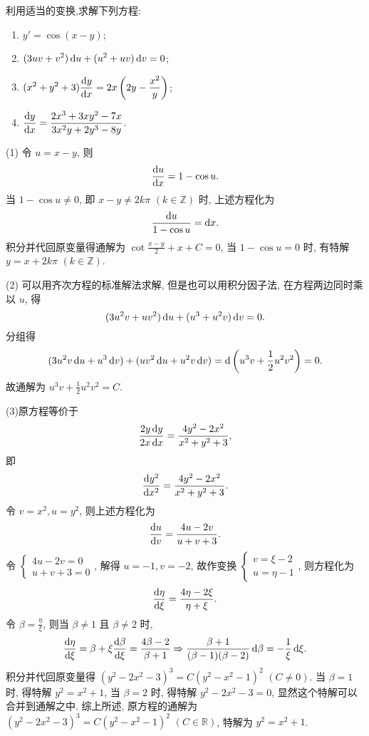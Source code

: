 \begin{exercise}
  利用适当的变换,求解下列方程:
  \begin{enumerate}[(1)]
  \item $\displaystyle y'=\cos(x-y)$;
  \item $\displaystyle(3uv+v^2)\mathop{}\!\mathrm{d} u+(u^2+uv)\mathop{}\!\mathrm{d} v=0$;
  \item $\displaystyle(x^2+y^2+3)\frac{\mathop{}\!\mathrm{d} y}{\mathop{}\!\mathrm{d} x}=2x\left(2y-\frac{x^2}{y}\right)$;
  \item $\displaystyle\frac{\mathop{}\!\mathrm{d} y}{\mathop{}\!\mathrm{d} x}=\frac{2x^3+3xy^2-7x}{3x^2y+2y^3-8y}$.
  \end{enumerate}
\end{exercise}

\begin{solve}
  (1) 令 $u=x-y$, 则
  \[\frac{\mathop{}\!\mathrm{d} u}{\mathop{}\!\mathrm{d} x}=1-\cos u.\]
  当 $1-\cos u\neq 0$, 即 $x-y\neq 2k\pi$ $(k\in\mathbb{Z})$ 时, 上述方程化为
  \[\frac{\mathop{}\!\mathrm{d} u}{1-\cos u}=\mathop{}\!\mathrm{d} x.\]
  积分并代回原变量得通解为 $\cot\frac{x-y}{2}+x+C=0$, 当 $1-\cos u=0$ 时,
  有特解 $y=x+2k\pi$ $(k\in\mathbb{Z})$.

  (2) 可以用齐次方程的标准解法求解, 但是也可以用积分因子法, 在方程两边同时乘以 $u$, 得
  \[(3u^2v+uv^2)\mathop{}\!\mathrm{d} u+(u^3+u^2v)\mathop{}\!\mathrm{d} v=0.\]
  分组得
  \[(3u^2v\mathop{}\!\mathrm{d} u+u^3\mathop{}\!\mathrm{d} v)+(uv^2\mathop{}\!\mathrm{d} u+u^2v\mathop{}\!\mathrm{d} v)=\mathop{}\!\mathrm{d}\left(u^3v+\frac{1}{2}u^2v^2\right)=0.\]
  故通解为 $u^3v+\frac{1}{2}u^2v^2=C$.

  (3)原方程等价于
  \[\frac{2y\mathop{}\!\mathrm{d} y}{2x\mathop{}\!\mathrm{d} x} = \frac{4y^2-2x^2}{x^2+y^2+3},\]
  即
  \[\frac{\mathop{}\!\mathrm{d} y^2}{\mathop{}\!\mathrm{d} x^2} = \frac{4y^2-2x^2}{x^2+y^2+3}.\]
  令 $v=x^2,u=y^2$, 则上述方程化为
  \[\frac{\mathop{}\!\mathrm{d} u}{\mathop{}\!\mathrm{d} v}=\frac{4u-2v}{u+v+3}.\]
  令 $\begin{cases}4u-2v=0\\u+v+3=0\end{cases}$, 解得 $u=-1,v=-2$, 故作变换
  $\begin{cases}v=\xi-2\\u=\eta-1\end{cases}$, 则方程化为
  \[\frac{\mathop{}\!\mathrm{d}\eta}{\mathop{}\!\mathrm{d}\xi}=\frac{4\eta-2\xi}{\eta+\xi}.\]
  令 $\beta=\frac{\eta}{\xi}$, 则当 $\beta\neq 1$ 且 $\beta\neq 2$ 时,
  \[\frac{\mathop{}\!\mathrm{d}\eta}{\mathop{}\!\mathrm{d}\xi}=\beta+\xi\frac{\mathop{}\!\mathrm{d}\beta}{\mathop{}\!\mathrm{d}\xi}
    = \frac{4\beta-2}{\beta+1}
    \Rightarrow\frac{\beta+1}{(\beta-1)(\beta-2)}\mathop{}\!\mathrm{d}\beta=-\frac{1}{\xi}\mathop{}\!\mathrm{d}\xi.\]
  积分并代回原变量得 $\left(y^2-2x^2-3\right)^3 = C\left(y^2-x^2-1\right)^2$ $(C\neq 0)$.
  当 $\beta=1$ 时, 得特解 $y^2=x^2+1$, 当 $\beta=2$ 时, 
  得特解 $y^2-2x^2-3=0$, 显然这个特解可以合并到通解之中.
  综上所述, 原方程的通解为 $\left(y^2-2x^2-3\right)^3=C\left(y^2-x^2-1\right)^2$ $(C\in\mathbb{R})$,
  特解为 $y^2=x^2+1$.


\end{solve}
